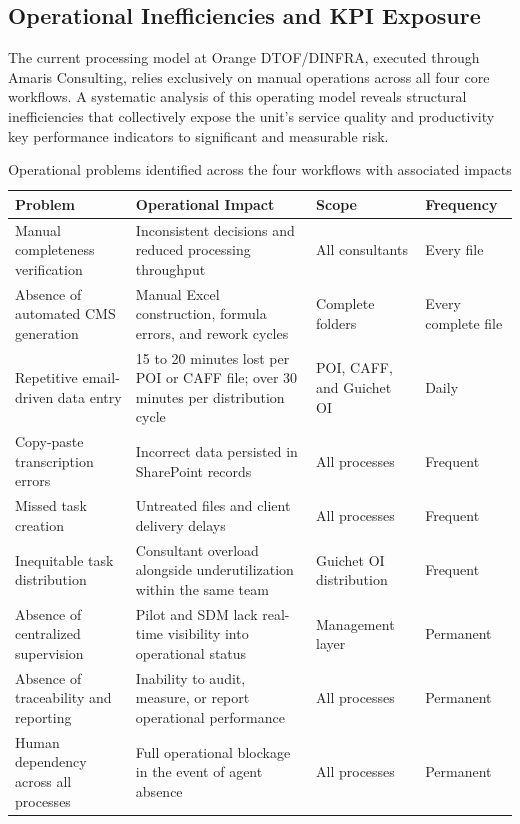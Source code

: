 \subsection{Operational Inefficiencies and KPI Exposure}

The current processing model at Orange DTOF/DINFRA, executed through Amaris Consulting, relies exclusively on manual operations across all four core workflows. A systematic analysis of this operating model reveals structural inefficiencies that collectively expose the unit's service quality and productivity key performance indicators to significant and measurable risk.

\begin{table}[H]
  \centering
  \caption{Operational problems identified across the four workflows with associated impacts}
  \renewcommand{\arraystretch}{1.0}
  \footnotesize
  \begin{tabularx}{\textwidth}{|X|X|X|X|}
    \hline
    \textbf{Problem} & \textbf{Operational Impact} & \textbf{Scope} & \textbf{Frequency} \\ \hline
    Manual completeness verification & Inconsistent decisions and reduced processing throughput & All consultants & Every file \\ \hline
    Absence of automated CMS generation & Manual Excel construction, formula errors, and rework cycles & Complete folders & Every complete file \\ \hline
    Repetitive email-driven data entry & 15 to 20 minutes lost per POI or CAFF file; over 30 minutes per distribution cycle & POI, CAFF, and Guichet OI & Daily \\ \hline
    Copy-paste transcription errors & Incorrect data persisted in SharePoint records & All processes & Frequent \\ \hline
    Missed task creation & Untreated files and client delivery delays & All processes & Frequent \\ \hline
    Inequitable task distribution & Consultant overload alongside underutilization within the same team & Guichet OI distribution & Frequent \\ \hline
    Absence of centralized supervision & Pilot and SDM lack real-time visibility into operational status & Management layer & Permanent \\ \hline
    Absence of traceability and reporting & Inability to audit, measure, or report operational performance & All processes & Permanent \\ \hline
    Human dependency across all processes & Full operational blockage in the event of agent absence & All processes & Permanent \\ \hline
  \end{tabularx}
\end{table}

